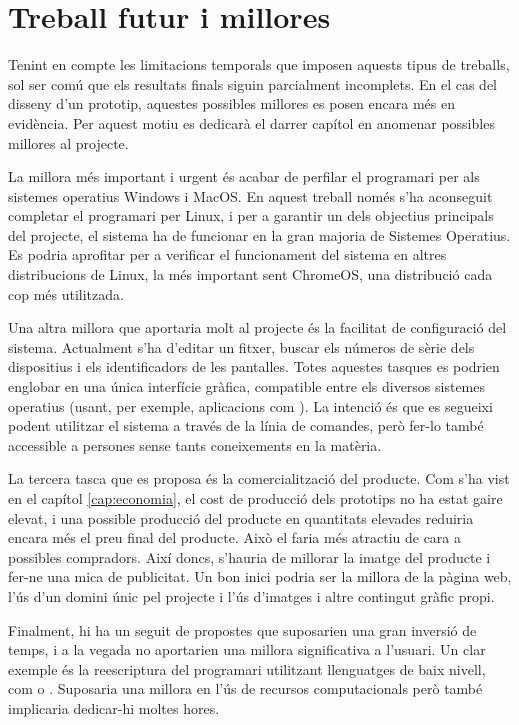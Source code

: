 \chapter{Treball futur i millores}
\label{cap:future_work}

Tenint en compte les limitacions temporals que imposen aquests tipus de
treballs, sol ser comú que els resultats finals siguin parcialment incomplets.
En el cas del disseny d'un prototip, aquestes possibles millores es posen encara
més en evidència. Per aquest motiu es dedicarà el darrer capítol en anomenar
possibles millores al projecte.

La millora més important i urgent és acabar de perfilar el programari per als
sistemes operatius Windows i MacOS. En aquest treball només s'ha aconseguit
completar el programari per Linux, i per a garantir un dels objectius principals
del projecte, el sistema ha de funcionar en la gran majoria de Sistemes
Operatius. Es podria aprofitar per a verificar el funcionament del sistema en
altres distribucions de Linux, la més important sent ChromeOS, una distribució
cada cop més utilitzada.

Una altra millora que aportaria molt al projecte és la facilitat de
configuració del sistema. Actualment s'ha d'editar un fitxer, buscar els números
de sèrie dels dispositius i els identificadors de les pantalles. Totes aquestes
tasques es podrien englobar en una única interfície gràfica, compatible entre
els diversos sistemes operatius (usant, per exemple, aplicacions com
). La intenció és que es segueixi podent utilitzar el sistema a
través de la línia de comandes, però fer-lo també accessible a persones sense
tants coneixements en la matèria.

La tercera tasca que es proposa és la comercialització del producte.
Com s'ha vist en el capítol \ref{cap:economia}, el cost de producció dels
prototips no ha estat gaire elevat, i una possible producció del producte en
quantitats elevades reduiria encara més el preu final del producte. Això el
faria més atractiu de cara a possibles compradors. Així doncs, s'hauria de
millorar la imatge del producte i fer-ne una mica de publicitat. Un bon inici
podria ser la millora de la pàgina web, l'ús d'un domini únic pel projecte
i l'ús d'imatges i altre contingut gràfic propi.

Finalment, hi ha un seguit de propostes que suposarien una gran inversió de
temps, i a la vegada no aportarien una millora significativa a l'usuari. Un clar
exemple és la reescriptura del programari utilitzant llenguatges de baix nivell,
com  o . Suposaria una millora en l'ús de recursos
computacionals però també implicaria dedicar-hi moltes hores.

